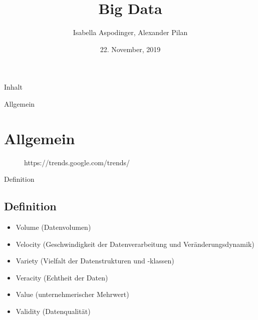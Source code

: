 \documentclass[11pt]{beamer}
\author{Isabella Aspodinger, Alexander Pilan}
\title{Big Data}
\institute{Paris Lodron Universität Salzburg}
\date{22. November, 2019}
\begin{document}
\begin{frame}
\titlepage
\end{frame}

\begin{frame}{Inhalt}
\tableofcontents
\end{frame}

\begin{frame}{Allgemein}
\section{Allgemein}
\begin{figure}[h]
		\caption{https://trends.google.com/trends/}
		\label{ris:image}
	\end{figure}
\end{frame}


\begin{frame}{Definition}
\subsection{Definition}


	\begin{itemize}
	\item Volume (Datenvolumen)
	\item Velocity (Geschwindigkeit der Datenverarbeitung und Veränderungsdynamik)
	\item Variety (Vielfalt der Datenstrukturen und -klassen)
	\item Veracity (Echtheit der Daten)
	\item Value (unternehmerischer Mehrwert)
	\item Validity (Datenqualität)
	\end{itemize}




\end{frame}
\end{document}
